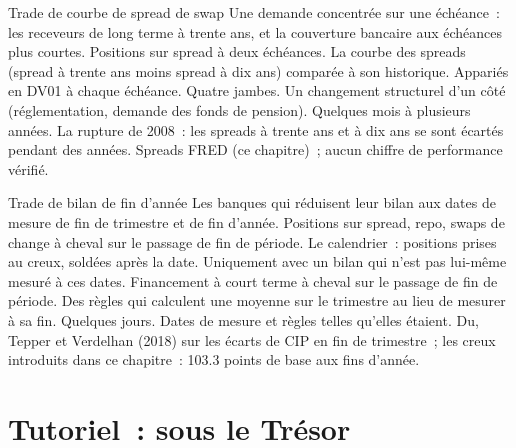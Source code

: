 \begin{strategyfile}{Trade de courbe de spread de swap}\label{strat:s2:swap-spread-and-asset-swap-trades:curve}
 Une demande concentrée sur une échéance~: les receveurs de long terme à trente ans, et la couverture bancaire aux échéances plus courtes.
 Positions sur spread à deux échéances.
 La courbe des spreads (spread à trente ans moins spread à dix ans) comparée à son historique.
 Appariés en DV01 à chaque échéance.
 Quatre jambes.
 Un changement structurel d'un côté (réglementation, demande des fonds de pension).
 Quelques mois à plusieurs années.
 La rupture de 2008~: les spreads à trente ans et à dix ans se sont écartés pendant des années.
 Spreads FRED (ce chapitre)~; aucun chiffre de performance vérifié.
\end{strategyfile}

\begin{strategyfile}{Trade de bilan de fin d'année}\label{strat:s2:swap-spread-and-asset-swap-trades:yearend}
 Les banques qui réduisent leur bilan aux dates de mesure de fin de trimestre et de fin d'année.
 Positions sur spread, repo, swaps de change à cheval sur le passage de fin de période.
 Le calendrier~: positions prises au creux, soldées après la date.
 Uniquement avec un bilan qui n'est pas lui-même mesuré à ces dates.
 Financement à court terme à cheval sur le passage de fin de période.
 Des règles qui calculent une moyenne sur le trimestre au lieu de mesurer à sa fin.
 Quelques jours.
 Dates de mesure et règles telles qu'elles étaient.
 Du, Tepper et Verdelhan (2018) sur les écarts de CIP en fin de trimestre~; les creux introduits dans ce chapitre~: 103.3 points de base aux fins d'année.
\end{strategyfile}

\section{Tutoriel~: sous le Trésor}\label{tut:s2:swap-spread-and-asset-swap-trades:tut}

